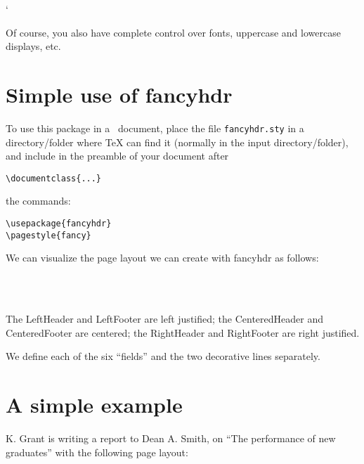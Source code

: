 `\documentclass[a4paper]{article}
\makeatletter
\def\tex/{\TeX}
\newcommand{\PSindex}[1]{\index{page style!#1@\string\texttt{#1}}}
\newenvironment{fblock}{\vspace{8pt}\begin{boxedminipage}{\textwidth}}{\end{boxedminipage}\vspace{8pt}}
\makeatother
\begin{document}
Of course, you also have complete control over fonts, uppercase
and lowercase displays, etc.

\section{Simple use of \textsf{fancyhdr}}  To use this package in a
\LaTeXe\ document, place the file \verb|fancyhdr.sty| in a
directory/folder where \tex/ can find it (normally in the input
directory/folder), and include in the preamble of your document
after

\begin{verbatim}
\documentclass{...}
\end{verbatim}
the commands: 

\PSindex{fancy}
\begin{verbatim}
\usepackage{fancyhdr}
\pagestyle{fancy}
\end{verbatim}

We can visualize the page layout we can create with \textsf{fancyhdr}
as follows:

\begin{fblock}
\noindent{}
\noindent\makebox[\textwidth]{\hrulefill}\\[\baselineskip]
\noindent{}\\[\baselineskip]
\noindent\makebox[\textwidth]{\hrulefill}
\noindent{}
\end{fblock}

The LeftHeader and LeftFooter are left justified; the
CenteredHeader and CenteredFooter are centered; the
RightHeader and RightFooter are right justified.

We define each of the six ``fields'' and the two decorative lines
separately.

\section{A simple example}  K. Grant is writing a report to Dean
A. Smith, on ``The performance of new graduates'' with the
following page layout:

\begin{fblock}
\noindent{}
\noindent\makebox[\textwidth]{\hrulefill}\\[\baselineskip]
\noindent{}\\[\baselineskip]
\noindent\makebox[\textwidth]{\hrulefill}
\noindent{}
\end{fblock}
\end{document}
